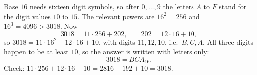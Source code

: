 Base $16$ needs sixteen digit symbols, so after $0,\dots,9$ the letters $A$ to $F$ stand for the digit values $10$ to $15$. The relevant powers are $16^2=256$ and $16^3=4096>3018$. Now
\[
3018=11\cdot256+202,\qquad 202=12\cdot16+10,
\]
so $3018=11\cdot16^2+12\cdot16+10$, with digits $11,12,10$, i.e.\ $B,C,A$. All three digits happen to be at least $10$, so the answer is written with letters only:
\[
3018=\boxed{BCA_{16}} .
\]
Check: $11\cdot256+12\cdot16+10=2816+192+10=3018$.
